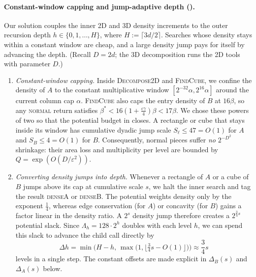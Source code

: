 \documentclass[11pt]{article}
\theoremstyle{definition}
\newcommand{\DecomposeTwoD}{\textnormal{\textsc{Decompose2D}}}
\newcommand{\FindCube}{\textnormal{\textsc{FindCube}}}
\newcommand{\tagdenseA}{\textnormal{\textsc{denseA}}}
\newcommand{\tagdenseB}{\textnormal{\textsc{denseB}}}
\newcommand{\tagnormal}{\textnormal{\textsc{normal}}}
\begin{document}
\paragraph{Constant-window capping and jump-adaptive depth ().}
Our solution couples the inner 2D and 3D density increments to the outer recursion depth $h \in \{0, 1, \dots, H\}$, where $H := \lceil 3d/2 \rceil$. Searches whose density stays within a constant window are cheap, and a large density jump pays for itself by advancing the depth. (Recall $D = 2d$; the 3D decomposition runs the 2D tools with parameter $D$.)
\begin{enumerate}[leftmargin=*]
    \item \emph{Constant-window capping.} Inside \DecomposeTwoD{} and \FindCube{}, we confine the density of $A$ to the constant multiplicative window $[2^{-32}\alpha, 2^{16}\alpha]$ around the current column cap $\alpha$. \FindCube{} also caps the entry density of $B$ at $16\beta$, so any \tagnormal{} return satisfies $\beta^* < 16(1 + \frac{\varepsilon\gamma}{4})\beta < 17\beta$. We chose these powers of two so that the potential budget in  closes. A rectangle or cube that stays inside its window has cumulative dyadic jump scale $S_\ell \le 47 = O(1)$ for $A$ and $S_B \le 4 = O(1)$ for $B$. Consequently, normal pieces suffer \emph{no} $2^{-D^2}$ shrinkage: their area loss and multiplicity per level are bounded by $Q = \exp(O(D/\varepsilon^2))$.
    \item \emph{Converting density jumps into depth.} Whenever a rectangle of $A$ or a cube of $B$ jumps above its cap at cumulative scale $s$, we halt the inner search and tag the result \tagdenseA{} or \tagdenseB{}. The potential weights density only by the exponent $\frac{1}{4}$, whereas edge conservation (for $A$) or concavity (for $B$) gains a factor linear in the density ratio. A $2^s$ density jump therefore creates a $2^{\frac{3}{4}s}$ potential slack. Since $\Lambda_h = 128 \cdot 2^h$ doubles with each level $h$, we can spend this slack to advance the child call directly by
    \[
        \Delta h = \min\!\Big(H - h, \, \max\big(1, \lfloor \tfrac{3}{4}s - O(1) \rfloor\big)\Big) \approx \frac{3}{4}s
    \]
    levels in a single step. The constant offsets are made explicit in $\Delta_B(s)$ and $\Delta_A(s)$ below.
\end{enumerate}
\end{document}
